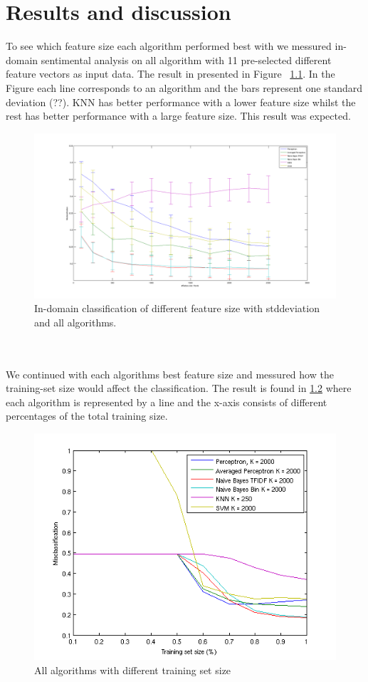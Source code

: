 \chapter{Results and discussion}
To see which feature size each algorithm performed best with we messured in-domain sentimental analysis on all algorithm with 11 pre-selected different feature vectors as input data. The result in presented in Figure ~\ref{fig:featuresize}. In the Figure each line corresponds to an algorithm and the bars represent one standard deviation (??). KNN has better performance with a lower feature size whilst the rest has better performance with a large feature size. This result was expected. 
\begin{figure}[h!]
\centering
\includegraphics[scale = 0.2]{fig/featuresize_plot_snowball_unigram.png}
\caption{In-domain classification of different feature size with stddeviation and all algorithms.}
\label{fig:featuresize}
\end{figure} \\\\
We continued with each algorithms best feature size and messured how the training-set size would affect the classification. The result is found in \ref{fig:trainingsize} where each algorithm is represented by a line and the x-axis consists of different percentages of the total training size. 
\begin{figure}[h!]
\centering
\includegraphics[scale = 0.5]{fig/training-size.png}
\caption{All algorithms with different training set size}
\label{fig:trainingsize}
\end{figure}  \\\\
